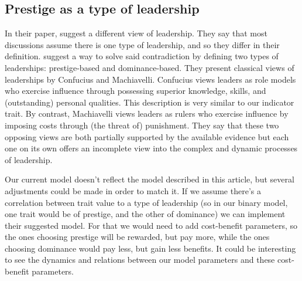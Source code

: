 \documentclass[11pt]{article}
\begin{document}
\subsection{Prestige as a type of leadership \citep{dual_leadership}}
In their paper, \citet{dual_leadership} suggest a different view of leadership. They say that most discussions assume there is one type of leadership, and so they differ in their definition. \citet{dual_leadership} suggest a way to solve said contradiction by defining two types of leaderships: prestige-based and dominance-based.
They present classical views of leaderships by Confucius and Machiavelli. Confucius views leaders as role models who exercise influence through possessing superior knowledge, skills,
and (outstanding) personal qualities. This description is very similar to our indicator trait. By contrast, Machiavelli views leaders as rulers who exercise influence by imposing costs through (the threat of) punishment. They say that these two opposing views are both partially supported by the available evidence but each one on its own offers an incomplete view into the complex and dynamic processes of leadership. 

Our current model doesn't reflect the model described in this article, but several adjustments could be made in order to match it. If we assume there's a correlation between trait value to a type of leadership (so in our binary model, one trait would be of prestige, and the other of dominance) we can implement their suggested model. For that we would need to add cost-benefit parameters, so the ones choosing prestige will be rewarded, but pay more, while the ones choosing dominance would pay less, but gain less benefits. It could be interesting to see the dynamics and relations between our model parameters and these cost-benefit parameters.
\end{document}
